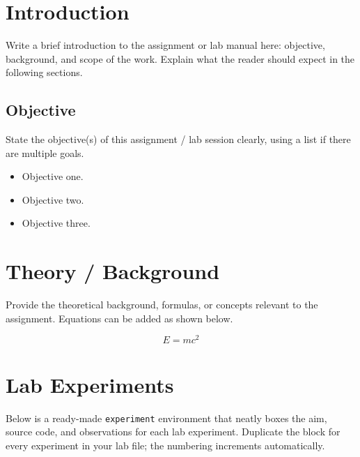 \documentclass[11pt,a4paper]{article}
\begin{document}
\tableofcontents
\newpage

\section{Introduction}
Write a brief introduction to the assignment or lab manual here: objective, background,
and scope of the work. Explain what the reader should expect in the following sections.

\subsection{Objective}
State the objective(s) of this assignment / lab session clearly, using a list if there
are multiple goals.

\begin{itemize}[leftmargin=1.4em]
  \item Objective one.
  \item Objective two.
  \item Objective three.
\end{itemize}

\section{Theory / Background}
Provide the theoretical background, formulas, or concepts relevant to the assignment.
Equations can be added as shown below.

\begin{equation}
  E = mc^2
\end{equation}

\section{Lab Experiments}

Below is a ready-made \texttt{experiment} environment that neatly boxes the aim,
source code, and observations for each lab experiment. Duplicate the block for every
experiment in your lab file; the numbering increments automatically.
\end{document}
